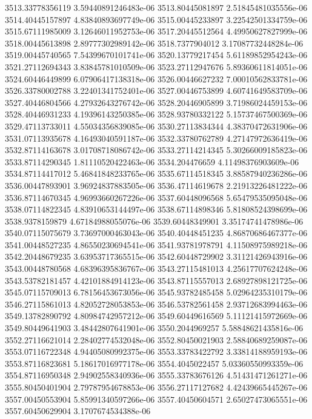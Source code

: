 {3513.33778356119 3.59440891246483e-06
3513.80445081897 2.51845481035556e-06
3514.40445157897 4.83840893697749e-06
3515.00445233897 3.22542501334759e-06
3515.67111985009 3.12646011952753e-06
3517.20445512564 4.49950627827999e-06
3518.00445613898 2.89777302989142e-06
3518.7377904012 3.17087732448284e-06
3519.00445740565 7.54399670101741e-06
3520.13779217454 5.61189852954243e-06
3521.27112694343 3.83845781010509e-06
3523.27112947676 5.89360611814051e-06
3524.60446449899 6.07906417138318e-06
3526.00446627232 7.00010562833781e-06
3526.33780002788 3.22401341752401e-06
3527.00446753899 4.60741649583709e-06
3527.40446804566 4.27932643276742e-06
3528.20446905899 3.71986024459153e-06
3528.40446931233 4.19396143250385e-06
3528.93780332122 5.15737467500369e-06
3529.47113733011 4.55034356839085e-06
3530.27113834344 4.38370472631906e-06
3531.07113935678 4.16493040591187e-06
3532.33780762789 4.27147972636419e-06
3532.87114163678 3.01708718086742e-06
3533.27114214345 5.30266009185823e-06
3533.87114290345 1.81110520422463e-06
3534.204476659 4.11498376903609e-06
3534.87114417012 5.46841848233765e-06
3535.67114518345 3.88587940236286e-06
3536.00447893901 3.96924837883505e-06
3536.47114619678 2.21913226481222e-06
3536.87114670345 4.96993660267226e-06
3537.60448096568 5.65479535095048e-06
3538.07114822345 4.83910653144497e-06
3538.67114898346 5.81808524398699e-06
3538.9378159879 4.67184988055076e-06
3539.60448349901 3.35174741478986e-06
3540.07115075679 3.73697000463043e-06
3540.40448451235 4.86870686467377e-06
3541.00448527235 4.86550230694541e-06
3541.93781978791 4.11508975989218e-06
3542.20448679235 3.63953717365515e-06
3542.60448729902 3.31121426943916e-06
3543.00448780568 4.68396395836767e-06
3543.27115481013 4.25617707624248e-06
3543.53782181457 4.42101884914123e-06
3543.87115557013 2.68927898121725e-06
3545.07115709013 6.78156453673056e-06
3545.93782485458 5.02964235310179e-06
3546.27115861013 4.82052728053853e-06
3546.53782561458 2.93712683994463e-06
3549.13782890792 4.80984742957212e-06
3549.60449616569 5.11121415972669e-06
3549.80449641903 3.48442807641901e-06
3550.2044969257 5.58848621435816e-06
3552.27116621014 2.28402774532048e-06
3552.80450021903 2.58840689259087e-06
3553.07116722348 4.94405080992375e-06
3553.33783422792 3.33814188959193e-06
3553.87116823681 5.18617016977178e-06
3554.4045022457 5.03360550993359e-06
3554.87116950348 2.94902558340936e-06
3555.33783676126 4.51431471261271e-06
3555.80450401904 2.79787954678853e-06
3556.27117127682 4.42439665445267e-06
3557.00450553904 5.85991340597266e-06
3557.40450604571 2.65027473065551e-06
3557.60450629904 3.1707674534388e-06
}
